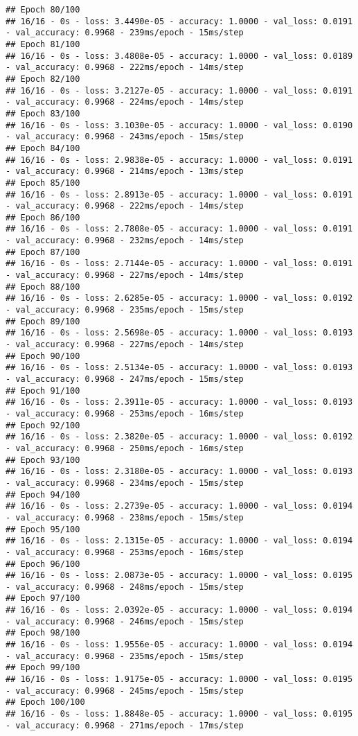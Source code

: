 \documentclass[
]{article}
\begin{document}
\begin{verbatim}
## Epoch 80/100
## 16/16 - 0s - loss: 3.4490e-05 - accuracy: 1.0000 - val_loss: 0.0191 - val_accuracy: 0.9968 - 239ms/epoch - 15ms/step
## Epoch 81/100
## 16/16 - 0s - loss: 3.4808e-05 - accuracy: 1.0000 - val_loss: 0.0189 - val_accuracy: 0.9968 - 222ms/epoch - 14ms/step
## Epoch 82/100
## 16/16 - 0s - loss: 3.2127e-05 - accuracy: 1.0000 - val_loss: 0.0191 - val_accuracy: 0.9968 - 224ms/epoch - 14ms/step
## Epoch 83/100
## 16/16 - 0s - loss: 3.1030e-05 - accuracy: 1.0000 - val_loss: 0.0190 - val_accuracy: 0.9968 - 243ms/epoch - 15ms/step
## Epoch 84/100
## 16/16 - 0s - loss: 2.9838e-05 - accuracy: 1.0000 - val_loss: 0.0191 - val_accuracy: 0.9968 - 214ms/epoch - 13ms/step
## Epoch 85/100
## 16/16 - 0s - loss: 2.8913e-05 - accuracy: 1.0000 - val_loss: 0.0191 - val_accuracy: 0.9968 - 222ms/epoch - 14ms/step
## Epoch 86/100
## 16/16 - 0s - loss: 2.7808e-05 - accuracy: 1.0000 - val_loss: 0.0191 - val_accuracy: 0.9968 - 232ms/epoch - 14ms/step
## Epoch 87/100
## 16/16 - 0s - loss: 2.7144e-05 - accuracy: 1.0000 - val_loss: 0.0191 - val_accuracy: 0.9968 - 227ms/epoch - 14ms/step
## Epoch 88/100
## 16/16 - 0s - loss: 2.6285e-05 - accuracy: 1.0000 - val_loss: 0.0192 - val_accuracy: 0.9968 - 235ms/epoch - 15ms/step
## Epoch 89/100
## 16/16 - 0s - loss: 2.5698e-05 - accuracy: 1.0000 - val_loss: 0.0193 - val_accuracy: 0.9968 - 227ms/epoch - 14ms/step
## Epoch 90/100
## 16/16 - 0s - loss: 2.5134e-05 - accuracy: 1.0000 - val_loss: 0.0193 - val_accuracy: 0.9968 - 247ms/epoch - 15ms/step
## Epoch 91/100
## 16/16 - 0s - loss: 2.3911e-05 - accuracy: 1.0000 - val_loss: 0.0193 - val_accuracy: 0.9968 - 253ms/epoch - 16ms/step
## Epoch 92/100
## 16/16 - 0s - loss: 2.3820e-05 - accuracy: 1.0000 - val_loss: 0.0192 - val_accuracy: 0.9968 - 250ms/epoch - 16ms/step
## Epoch 93/100
## 16/16 - 0s - loss: 2.3180e-05 - accuracy: 1.0000 - val_loss: 0.0193 - val_accuracy: 0.9968 - 234ms/epoch - 15ms/step
## Epoch 94/100
## 16/16 - 0s - loss: 2.2739e-05 - accuracy: 1.0000 - val_loss: 0.0194 - val_accuracy: 0.9968 - 238ms/epoch - 15ms/step
## Epoch 95/100
## 16/16 - 0s - loss: 2.1315e-05 - accuracy: 1.0000 - val_loss: 0.0194 - val_accuracy: 0.9968 - 253ms/epoch - 16ms/step
## Epoch 96/100
## 16/16 - 0s - loss: 2.0873e-05 - accuracy: 1.0000 - val_loss: 0.0195 - val_accuracy: 0.9968 - 248ms/epoch - 15ms/step
## Epoch 97/100
## 16/16 - 0s - loss: 2.0392e-05 - accuracy: 1.0000 - val_loss: 0.0194 - val_accuracy: 0.9968 - 246ms/epoch - 15ms/step
## Epoch 98/100
## 16/16 - 0s - loss: 1.9556e-05 - accuracy: 1.0000 - val_loss: 0.0194 - val_accuracy: 0.9968 - 235ms/epoch - 15ms/step
## Epoch 99/100
## 16/16 - 0s - loss: 1.9175e-05 - accuracy: 1.0000 - val_loss: 0.0195 - val_accuracy: 0.9968 - 245ms/epoch - 15ms/step
## Epoch 100/100
## 16/16 - 0s - loss: 1.8848e-05 - accuracy: 1.0000 - val_loss: 0.0195 - val_accuracy: 0.9968 - 271ms/epoch - 17ms/step
\end{verbatim}
\end{document}
